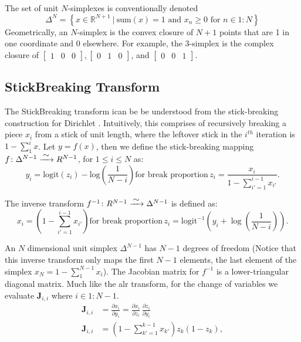 \documentclass[11pt]{article}
\newcommand{\setcomp}[2]{\left\{ #1 \ \Big|\ #2 \right\}}
\newcommand{\rngto}[1]{1{:}#1}
\begin{document}
The set of unit $N$-simplexes is conventionally denoted
\[
  \Delta^N = \setcomp{x \in \mathbb{R}^{N + 1}}{\textrm{sum}(x) = 1
    \textrm{ and }
    x_n \geq 0 \textrm{ for } n \in \rngto{N}}
\]
Geometrically, an $N$-simplex is the convex closure of $N+1$ points
that are 1 in one coordinate and 0 elsewhere.  For example, the
3-simplex is the complex closure of
$\begin{bmatrix}1 & 0 & 0 \end{bmatrix},
\begin{bmatrix} 0 & 1 & 0 \end{bmatrix}$,
and $\begin{bmatrix} 0 & 0 & 1 \end{bmatrix}$.

\subsection{StickBreaking Transform}

The StickBreaking transform ican be be understood from the stick-breaking construction for Dirichlet \cite{sethurman}. Intuitively, this comprises of recursively breaking a piece $x_i$ from a stick of unit length, where the leftover stick in the $i^{th}$ iteration is $ 1 - \sum_{1}^{i}x$. Let $y = f(x)$, then we define the stick-breaking mapping $ f \colon \Delta^{N-1} \xrightarrow{\makebox[0.4cm]{$\sim$}}  R^{N-1}$, for $1 \leq i \leq N$ as:	
\[
y_i
= \mathrm{logit}(z_i) - \mbox{log}\left(\frac{1}{N-i}
   \right) \text{for break proportion} \, 
   z_i = \frac{x_i}{1 - \sum_{i' = 1}^{i-1} x_{i'}}.
\]

The inverse transform $ f^{-1} \colon R^{N-1} \xrightarrow{\makebox[0.4cm]{$\sim$}}  \Delta^{N-1}$ is defined as:
\[
x_i =
\left( 1 - \sum_{i'=1}^{i-1} x_{i'} \right) \text{for break proportion} \, z_i = \mathrm{logit}^{-1} \left( y_i
                             + \log \left( \frac{1}{N - i}
                                            \right)\right).
                                            \]
                            
An $N$ dimensional unit simplex $\Delta^{N-1}$ has $N-1$ degrees of freedom (Notice that this inverse transform only maps the first $N-1$ elements, the last element of the simplex $x_{N} = 1 - \sum_1^{N-1}{x_i}$). The Jacobian matrix for $f^{-1}$ is a lower-triangular diagonal matrix. Much like the alr transform, for the change of variables we evaluate $\mathbf{J}_{i, i}$ where $i \in 1:N-1$.
\begin{align*}
\mathbf{J}_{i, i} &= \frac{\partial x_i}{\partial y_i}
=
\frac{\partial x_i}{\partial z_i} \,
\frac{\partial z_i}{\partial y_i}\\
\mathbf{J}_{i, i} &= \left(
  1 - \sum_{k' = 1}^{k-1} x_{k'}
   \right) z_k (1 - z_k),
\end{align*}
\end{document}
